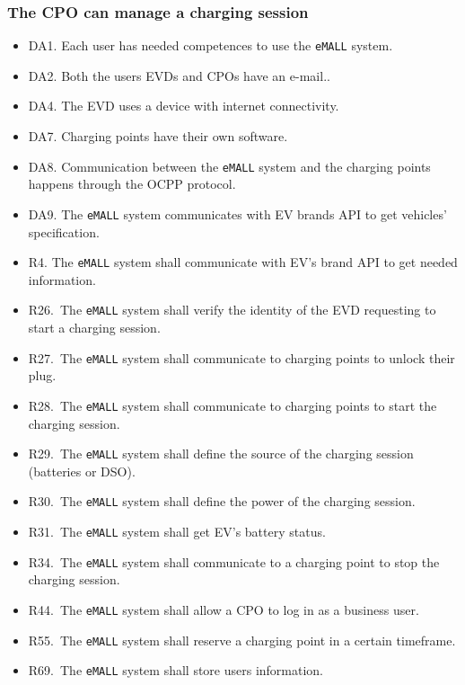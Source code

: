 \subsubsection{The CPO can manage a charging session}
\begin{itemize}
    \item DA1. Each user has needed competences to use the \verb|eMALL| system.
    \item DA2. Both the users EVDs and CPOs have an e-mail..
    \item DA4. The EVD uses a device with internet connectivity.
    \item DA7. Charging points have their own software.
    \item DA8. Communication between the \verb|eMALL| system and the charging points happens through the OCPP protocol.
    \item DA9. The \verb|eMALL| system communicates with EV brands API to get vehicles’ specification.
    \item R4. The \verb|eMALL| system shall communicate with EV’s brand API to get needed information.
    \item R26.\ The \verb|eMALL| system shall verify the identity of the EVD requesting to start a
    charging session.
    \item R27.\ The \verb|eMALL| system shall communicate to charging points to unlock their plug.
    \item R28.\ The \verb|eMALL| system shall communicate to charging points to start the charging
    session.
    \item R29.\ The \verb|eMALL| system shall define the source of the charging session (batteries or
    DSO).
    \item R30.\ The \verb|eMALL| system shall define the power of the charging session.
    \item R31.\ The \verb|eMALL| system shall get EV’s battery status.
    \item R34.\ The \verb|eMALL| system shall communicate to a charging point to stop the charging
    session.
    \item R44.\ The \verb|eMALL| system shall allow a CPO to log in as a business user.
    \item R55.\ The \verb|eMALL| system shall reserve a charging point in a certain timeframe.
    \item R69.\ The \verb|eMALL| system shall store users information.
\end{itemize}

